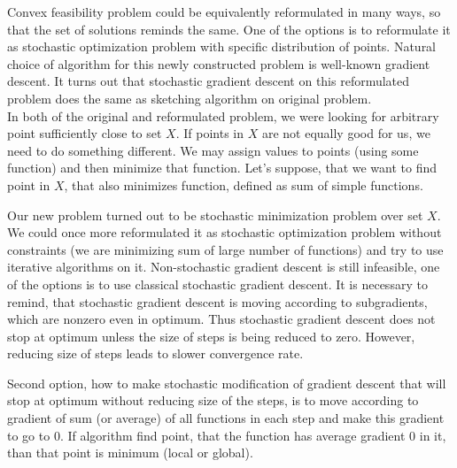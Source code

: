 \documentclass[11pt]{book}
\begin{document}
Convex feasibility problem could be equivalently reformulated in many ways, so that the set of solutions reminds the same. One of the options is to reformulate it as stochastic optimization problem with specific distribution of points. Natural choice of algorithm for this newly constructed problem is well-known gradient descent. It turns out that stochastic gradient descent on this reformulated problem does the same as sketching algorithm on original problem.\\

In both of the original and reformulated problem, we were looking for arbitrary point sufficiently close to set $X$. If points in $X$ are not equally good for us, we need to do something different. We may assign values to points (using some function) and then minimize that function. Let's suppose, that we want to find point in $X$, that also minimizes function, defined as sum of simple functions.



Our new problem turned out to be stochastic minimization problem over set $X$. We could once more reformulated it as stochastic optimization problem without constraints (we are minimizing sum of large number of functions) and try to use iterative algorithms on it. Non-stochastic gradient descent is still infeasible, one of the options is to use classical stochastic gradient descent. It is necessary to remind, that stochastic gradient descent is moving according to subgradients, which are nonzero even in optimum. Thus stochastic gradient descent does not stop at optimum unless the size of steps is being reduced to zero. However, reducing size of steps leads to slower convergence rate.

Second option, how to make stochastic modification of gradient descent that will stop at optimum without reducing size of the steps, is to move according to gradient of sum (or average) of all functions in each step and make this gradient to go to $0$. If algorithm find point, that the function has average gradient $0$  in it, than that point is minimum (local or global).
\end{document}
